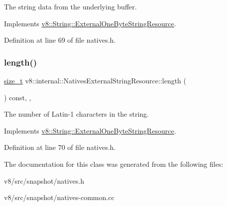 The string data from the underlying buffer. 

Implements \mbox{\hyperlink{classv8_1_1String_1_1ExternalOneByteStringResource_aaeca31240d3dbf990d1b974e3c64593e}{v8\+::\+String\+::\+External\+One\+Byte\+String\+Resource}}.



Definition at line 69 of file natives.\+h.

\mbox{\label{classv8_1_1internal_1_1NativesExternalStringResource_aea52fbf749b2a249d23ce74caa8db7f1}} 
\subsubsection{\texorpdfstring{length()}{length()}}
{\footnotesize\ttfamily \mbox{\hyperlink{classsize__t}{size\+\_\+t}} v8\+::internal\+::\+Natives\+External\+String\+Resource\+::length (\begin{DoxyParamCaption}{ }\end{DoxyParamCaption}) const\hspace{0.3cm}{\ttfamily [inline]}, {\ttfamily [override]}, {\ttfamily [virtual]}}

The number of Latin-\/1 characters in the string. 

Implements \mbox{\hyperlink{classv8_1_1String_1_1ExternalOneByteStringResource_ad6b702f05798bcfc3975cb922f32b5ab}{v8\+::\+String\+::\+External\+One\+Byte\+String\+Resource}}.



Definition at line 70 of file natives.\+h.



The documentation for this class was generated from the following files\+:\begin{DoxyCompactItemize}
\item 
v8/src/snapshot/natives.\+h\item 
v8/src/snapshot/natives-\/common.\+cc\end{DoxyCompactItemize}
